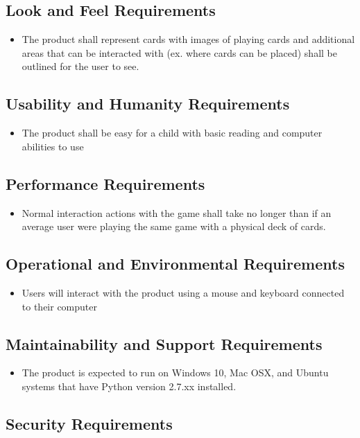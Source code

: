 \documentclass{article}
\begin{document}
		\subsection{Look and Feel Requirements}
		\begin{itemize}
			\itemsep0em
			\item The product shall represent cards with images of playing 
			cards and additional areas that can be interacted with (ex. where 
			cards can be placed) shall be outlined for the user to see.
		\end{itemize}
		\subsection{Usability and Humanity Requirements}
		\begin{itemize}
			\itemsep0em
			\item The product shall be easy for a child with basic reading and 
			computer abilities to use
		\end{itemize}
		\subsection{Performance Requirements}
		\begin{itemize}
			\itemsep0em
			\item Normal interaction actions with the game shall take no longer 
			than if an average user were playing the same game with a physical 
			deck of cards.
		\end{itemize}
		\subsection{Operational and Environmental Requirements}
		\begin{itemize}
			\itemsep0em
			\item Users will interact with the product using a mouse and 
			keyboard connected to their computer
		\end{itemize}
		\subsection{Maintainability and Support Requirements}
		\begin{itemize}
			\itemsep0em
			\item The product is expected to run on Windows 10, Mac OSX, and 
			Ubuntu systems that have Python version 2.7.xx installed.
		\end{itemize}
		\subsection{Security Requirements}
\end{document}
